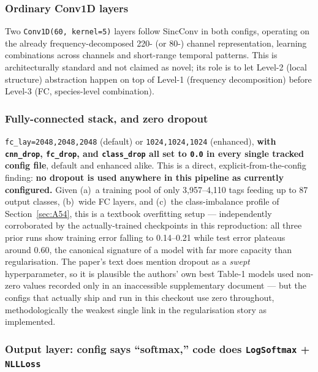 \documentclass[11pt]{article}
\begin{document}
\subsubsection{Ordinary Conv1D layers}

Two \texttt{Conv1D(60, kernel=5)} layers follow SincConv in both configs,
operating on the already frequency-decomposed 220- (or 80-) channel
representation, learning combinations across channels and short-range
temporal patterns. This is architecturally standard and not claimed as
novel; its role is to let Level-2 (local structure) abstraction happen on
top of Level-1 (frequency decomposition) before Level-3 (FC, species-level
combination).

\subsubsection{Fully-connected stack, and zero dropout}
\label{sec:B38}

\texttt{fc\_lay=2048,2048,2048} (default) or \texttt{1024,1024,1024}
(enhanced), \textbf{with \texttt{cnn\_drop}, \texttt{fc\_drop}, and
\texttt{class\_drop} all set to \texttt{0.0} in every single tracked config
file}, default and enhanced alike. This is a direct, explicit-from-the-config
finding: \textbf{no dropout is used anywhere in this pipeline as currently
configured.} Given (a)~a training pool of only 3,957--4,110 tags feeding up
to 87 output classes, (b)~wide FC layers, and (c)~the class-imbalance
profile of Section~\ref{sec:A54}, this is a textbook overfitting setup ---
independently corroborated by the actually-trained checkpoints in this
reproduction: all three prior runs show training error falling to
0.14--0.21 while test error plateaus around 0.60, the canonical signature of
a model with far more capacity than regularisation. The paper's text does
mention dropout as a \emph{swept} hyperparameter, so it is plausible the
authors' own best Table-1 models used non-zero values recorded only in an
inaccessible supplementary document --- but the configs that actually ship
and run in this checkout use zero throughout, methodologically the weakest
single link in the regularisation story as implemented.

\subsubsection{Output layer: config says ``softmax,'' code does \texttt{LogSoftmax} + \texttt{NLLLoss}}
\end{document}
